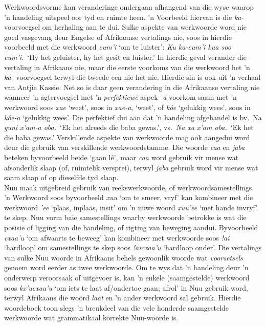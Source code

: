 Werkwoordsvorme kan veranderinge ondergaan afhangend van die wyse
waarop 'n handeling uitspeel oor tyd en ruimte heen. 'n Voorbeeld
hiervan is die \emph{ka-} voorvoegsel om herhaling aan te dui. Sulke
aspekte van werkwoorde word nie goed vasgevang deur Engelse of
Afrikaanse vertalings nie, soos in hierdie voorbeeld met die werkwoord
\emph{cum'i} `om te luister': \emph{Ku ka-cum'i kua soo cum'i.}\ `Hy
het geluister, hy het gesit en luister.' In hierdie geval verander die
vertaling in Afrikaans nie, maar die eerste voorkoms van die werkwoord
het 'n \emph{ka-} voorvoegsel terwyl die tweede een nie het nie.
Hierdie sin is ook uit 'n verhaal van Antjie Kassie. Net so is daar
geen verandering in die Afrikaanse vertaling nie wanneer 'n
agtervoegsel met 'n \emph{perfektiewe} aspek \emph{-a} voorkom saam
met 'n werkwoord soos \emph{\textipa{\textdoublevertline}xae} `weet',
soos in \emph{\textipa{\textdoublevertline}xae-a}, `weet', of
\emph{k\^{o}e} `gelukkig wees', soos in \emph{k\^{o}e-a} `gelukkig
wees'. Die perfektief dui aan dat 'n handeling afgehandel is bv.\ Na
\emph{g\textipa{\textvertline}uni \textipa{\textdoublevertline}x'am-a
\textipa{\textvertline}oba.}\ `Ek het alreeds die baba gewas.', vs.\
\emph{Na xa \textipa{\textdoublevertline}x'am
\textipa{\textvertline}oba.}\ `Ek het die baba gewas.' Verskillende
aspekte van werkwoorde mag ook aangedui word deur die gebruik van
verskillende werk\-woord\-stamme. Die woorde \emph{caa} en \emph{jaba}
beteken byvoorbeeld beide `gaan l\^{e}', maar \emph{caa} word gebruik
vir mense wat afsonderlik slaap (of, ruimtelik versprei), terwyl
\emph{jaba} gebruik word vir mense wat saam slaap of op dieselfde tyd
slaap.\\

N\textipa{\textvertline}uu maak uitgebreid gebruik van
reekswerkwoorde, of werkwoordsamestellings. 'n Werkwoord soos
byvoorbeeld \emph{xuu} `om te smeer, vryf' kan kombineer
met die werkwoord \emph{\textipa{\textvertline}'ee} `plaas, inplaas,
insit' om 'n nuwe woord
\emph{xuu\textipa{\textvertline}'ee} `met hande invryf'
te skep. N\textipa{\textvertline}uu vorm baie samestellings waarby
werkwoorde betrokke is wat die posisie of ligging van die handeling,
of rigting van beweging aandui. Byvoorbeeld \emph{cxaa'u} `om afwaarts
te beweeg' kan kombineer met werkwoorde soos \emph{!ai} `hardloop' om
samestellings te skep soos \emph{!aicxaa'u} `hardloop onder'. Die
vertalings van sulke N\textipa{\textvertline}uu woorde in Afrikaans
behels gewoonlik woorde wat \emph{voorsetsels} genoem word eerder as
twee werkwoorde. Om te wys dat 'n handeling deur 'n onderwerp
veroorsaak of uitgevoer is, kan 'n enkele (saamgestelde) werkwoord
soos \emph{kx'ucxaa'u} `om iets te laat af/ondertoe gaan; afrol' in
N\textipa{\textvertline}uu gebruik word, terwyl Afrikaans die woord
\emph{laat} en 'n ander werkwoord sal gebruik. Hierdie woordeboek toon slegs
'n breukdeel van die vele honderde saamgestelde werkwoorde wat
grammatikaal korrekte N\textipa{\textvertline}uu-woorde is.\\


